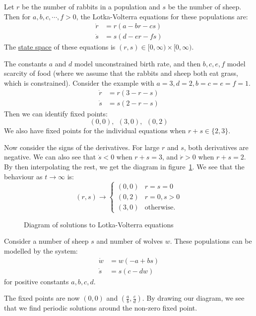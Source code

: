 \documentclass[../Main.tex]{subfiles}
\begin{document}
\begin{example}
    \label{exLotkaVolterra}
    Let $r$ be the number of rabbits in a population and $s$ be the number of sheep. Then for $a, b, c, \cdots, f > 0$, the Lotka-Volterra equations for these populations are:
    \begin{align*}
        \dot{r} &= r(a - br - cs) \\
        \dot{s} &= s(d - er - fs)
    \end{align*}
    The \underline{state space} of these equations is $(r, s) \in [0, \infty) \times [0, \infty)$.

    The constants $a$ and $d$ model unconstrained birth rate, and then $b, c, e, f$ model scarcity of food (where we assume that the rabbits and sheep both eat grass, which is constrained).
    Consider the example with $a = 3, d = 2, b=c=e=f=1$.
    \begin{align*}
        \dot{r} &= r(3 - r - s) \\
        \dot{s} &= s(2 - r - s)
    \end{align*}
    Then we can identify fixed points:
    \begin{equation*}
        (0, 0),~~(3, 0),~~(0, 2)
    \end{equation*}
    We also have fixed points for the individual equations when $r+s \in \{2, 3\}$.

    Now consider the signs of the derivatives. For large $r$ and $s$, both derivatives are negative. We can also see that $\dot{s} < 0$ when $r + s = 3$, and $\dot{r} > 0$ when $r + s = 2$. By then interpolating the rest, we get the diagram in figure~\ref{figLotkaVolterra}. We see that the behaviour as $t \to \infty$ is:
    \begin{equation*}
        (r, s) \to
        \begin{cases}
            (0, 0) & r = s = 0 \\
            (0, 2) & r = 0, s > 0 \\
            (3, 0) & \text{otherwise}.
        \end{cases}
    \end{equation*}
\end{example}
\begin{figure}
    \label{figLotkaVolterra}
    \caption{Diagram of solutions to Lotka-Volterra equations}
\end{figure}
\begin{example}
    Consider a number of sheep $s$ and number of wolves $w$. These populations can be modelled by the system:
    \begin{align*}
        \dot{w} &= w(-a + bs) \\
        \dot{s} &= s(c - dw)
    \end{align*}
    for positive constants $a, b, c, d$.

    The fixed points are now $(0, 0)$ and $\left(\frac{a}{b}, \frac{c}{d}\right)$. By drawing our diagram, we see that we find periodic solutions around the non-zero fixed point.
\end{example}
\end{document}
